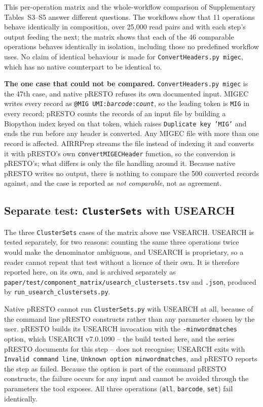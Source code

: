 \documentclass[11pt]{article}
\begin{document}
This per-operation matrix and the whole-workflow comparison of Supplementary
Tables~S3--S5 answer different questions. The workflows show that 11 operations
behave identically in composition, over 25,000 read pairs and with each step's
output feeding the next; the matrix shows that each of the 46 comparable
operations behaves identically in isolation, including those no predefined
workflow uses. No claim of identical behaviour is made for
\texttt{ConvertHeaders.py migec}, which has no native counterpart to be
identical to.

\textbf{The one case that could not be compared.} \texttt{ConvertHeaders.py
migec} is the 47th case, and native pRESTO refuses its own documented input.
MIGEC writes every record as \texttt{@MIG UMI:\textit{barcode}:\textit{count}},
so the leading token is \texttt{MIG} in every record; pRESTO counts the records of an
input file by building a Biopython index keyed on that token, which raises
\texttt{Duplicate key 'MIG'} and ends the run before any header is converted.
Any MIGEC file with more than one record is affected. AIRRPrep streams the file
instead of indexing it and converts it with pRESTO's own
\texttt{convertMIGECHeader} function, so the conversion is pRESTO's; what
differs is only the file handling around it. Because native pRESTO writes no
output, there is nothing to compare the 500 converted records against, and the
case is reported as \emph{not comparable}, not as agreement.

\subsection*{Separate test: \texttt{ClusterSets} with USEARCH}

The three \texttt{ClusterSets} cases of the matrix above use VSEARCH. USEARCH
is tested separately, for two reasons: counting the same three operations twice
would make the denominator ambiguous, and USEARCH is proprietary, so a reader
cannot repeat that test without a licence of their own. It is therefore
reported here, on its own, and is archived separately as
\texttt{paper/test/component\_matrix/usearch\_clustersets.tsv} and
\texttt{.json}, produced by \texttt{run\_usearch\_clustersets.py}.

Native pRESTO cannot run \texttt{ClusterSets.py} with USEARCH at all, because
of the command line pRESTO constructs rather than any parameter chosen by the
user. pRESTO builds its USEARCH invocation with the \texttt{-minwordmatches}
option, which USEARCH v7.0.1090 -- the build tested here, and the series pRESTO
documents for this step -- does not recognise; USEARCH exits with
\texttt{Invalid command line}, \texttt{Unknown option minwordmatches}, and
pRESTO reports the step as failed. Because the option is part of the command
pRESTO constructs, the failure occurs for any input and cannot be avoided
through the parameters the tool exposes. All three operations
(\texttt{all}, \texttt{barcode}, \texttt{set}) fail identically.
\end{document}
